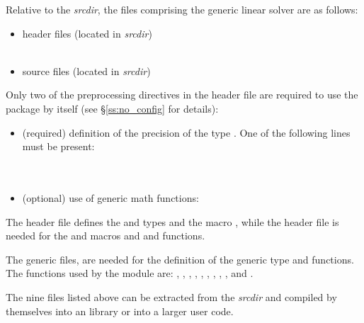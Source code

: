 Relative to the {\sundials} {\em srcdir}, the files comprising the
{\spgmr} generic linear solver are as follows:
\begin{itemize}
\item header files (located in {\em srcdir})\\
     \\
     
\item source files (located in {\em srcdir})\\
    
\end{itemize}
Only two of the preprocessing directives in the header file  
are required to use the {\spgmr} package by itself (see \S\ref{ss:no_config} for details):
\begin{itemize}
\item (required) definition of the precision of the {\sundials} type . 
  One of the following lines must be present:\\
  \\
  \\
\item (optional) use of generic math functions:\\
\end{itemize}
The  header file defines the {\sundials}
 and  types and the macro , while the 
 header file is needed for the  and  macros
and  and  functions.

The generic {\nvector} files,  are needed for the
definition of the generic  type and functions. 
The {\nvector} functions used by the {\spgmr} module are: 
, , , , , 
, , , , and
.

The nine files listed above can be extracted from the {\sundials} {\em srcdir} and
compiled by themselves into an {\spgmr} library or into a larger user code.
 
